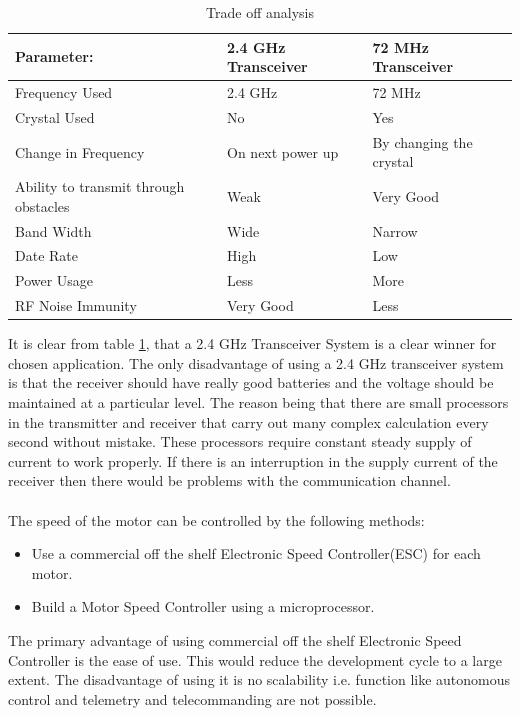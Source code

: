 \begin{center}
\begin{table}[bht]
\begin{tabular}{l l l|}
\hline
\textbf{Parameter:} &  \textbf{2.4 GHz Transceiver} & \textbf{72 MHz Transceiver}\\ 
\hline
Frequency Used & 2.4 GHz & 72 MHz \\
Crystal Used & No & Yes \\
Change in Frequency & On next power up & By changing the crystal \\
Ability to transmit through obstacles & Weak & Very Good\\
Band Width & Wide & Narrow\\
Date Rate & High & Low\\
Power Usage & Less & More\\
RF Noise Immunity & Very Good & Less \\
\hline
\end{tabular}
\caption{Trade off analysis}
\label{tab:TradeOff}
\end{table}
\vspace{-2.0em}
\end{center}

\noindent
It is clear from table \ref{tab:TradeOff}, that a 2.4 GHz Transceiver System is a clear winner for chosen application. The only disadvantage of using a 2.4 GHz transceiver system is that the receiver should have really good batteries and the voltage should be maintained at a particular level. The reason being that there are small processors in the transmitter and receiver that carry out many complex calculation every second without mistake. These processors require constant steady supply of current to work properly. If there is an interruption in the supply current of the receiver then there would be problems with the communication channel.
\\
\\
The speed of the motor can be controlled by the following methods:
\begin{itemize}
\item Use a commercial off the shelf Electronic Speed Controller(ESC) for each motor.
\item Build a Motor Speed Controller using a microprocessor.
\end{itemize}

\noindent
The primary advantage of using commercial off the shelf Electronic Speed Controller is the ease of use. This would reduce the development cycle to a large extent. The disadvantage of using it is no scalability i.e. function like autonomous control and telemetry and telecommanding are not possible.

